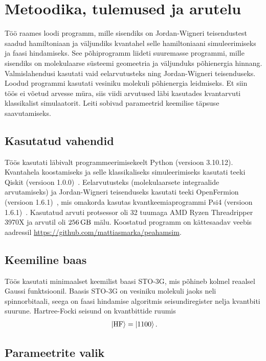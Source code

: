 \documentclass[12pt]{report}
\def\ket#1{\left|#1\right>}
\begin{document}
\chapter{Metoodika, tulemused ja arutelu}\label{chap:results}

Töö raames loodi programm, mille sisendiks on Jordan-Wigneri teisendustest saadud hamiltoniaan ja väljundiks kvantahel selle hamiltoniaani simuleerimiseks ja faasi hindamiseks.
See põhiprogramm liideti suuremasse programmi, mille sisendiks on molekulaarse süsteemi geomeetria ja väljunduks põhienergia hinnang.
Valmislahendusi kasutati vaid eelarvutusteks ning Jordan-Wigneri teisenduseks.
Loodud programmi kasutati vesiniku molekuli põhienergia leidmiseks.
Et siin töös ei võetud arvesse müra, siis viidi arvutused läbi kasutades kvantarvuti klassikalist simulaatorit.
Leiti sobivad parameetrid keemilise täpsuse saavutamiseks.

\section{Kasutatud vahendid}

Töös kasutati läbivalt programmeerimisekeelt Python (versioon 3.10.12).
Kvantahela koostamiseks ja selle klassikaliseks simuleerimiseks kasutati teeki Qiskit (versioon 1.0.0)~\cite{qiskit}.
Eelarvutusteks (molekulaarsete integraalide arvutamiseks) ja Jordan-Wigneri teisenduseks kasutati teeki OpenFermion (versioon 1.6.1)~\cite{openfermion}, mis omakorda kasutas kvantkeemiaprogrammi Psi4 (versioon 1.6.1)~\cite{psi4}.
Kasutatud arvuti protsessor oli 32 tuumaga AMD Ryzen Threadripper 3970X ja arvutil oli \(256\,{\rm GB}\) mälu.
Koostatud programm on kättesaadav veebis aadressil \url{https://github.com/mattiasmarka/peahamsim}.

\section{Keemiline baas}

Töös kasutati minimaalset keemilist baasi STO-3G, mis põhineb kolmel reaalsel Gaussi funktsioonil.
Baasis STO-3G on vesiniku molekuli jaoks neli spinnorbitaali, seega on faasi hindamise algoritmis seisundiregister nelja kvantbiti suurune.
Hartree-Focki seisund on kvantbittide ruumis
\begin{align}
  \ket{\text{HF}} = \ket{1100} \rlap{.}
\end{align}

\section{Parameetrite valik}
\end{document}
